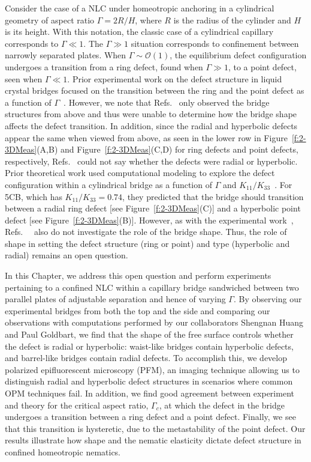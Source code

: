 Consider the case of a NLC under homeotropic anchoring in a cylindrical geometry of aspect ratio $\Gamma = 2 R/H$, where $R$ is the radius of the cylinder and $H$ is its height.
With this notation, the classic case of a cylindrical capillary corresponds to $\Gamma \ll 1$. The $\Gamma \gg 1$ situation corresponds to confinement between narrowly separated plates.
When $\Gamma \sim \mathcal{O}\left( 1 \right)$, the equilibrium defect configuration undergoes a transition from a ring defect, found when $\Gamma \gg 1$, to a point defect, seen when $\Gamma \ll 1$.
Prior experimental work on the defect structure in liquid crystal bridges focused on the transition between the ring and the point defect as a function of $\Gamma$~\cite{RN139,RN147}.
However, we note that Refs.~\cite{RN139,RN147} only observed the bridge structures from above and thus were unable to determine how the bridge shape affects the defect transition.
In addition, since the radial and hyperbolic defects appear the same when viewed from above, as seen in the lower row in Figure~\ref{f:2-3DMeas}(A,B) and Figure~\ref{f:2-3DMeas}(C,D) for ring defects and point defects, respectively, Refs.~\cite{RN139,RN147} could not say whether the defects were radial or hyperbolic.
Prior theoretical work used computational modeling to explore the defect configuration within a cylindrical bridge as a function of $\Gamma$ and $K_{11}/K_{33}$~\cite{RN138,RN144}.
For 5CB, which has $K_{11}/K_{33} = 0.74$, they predicted that the bridge should transition between a radial ring defect [see Figure~\ref{f:2-3DMeas}(C)] and a hyperbolic point defect [see Figure~\ref{f:2-3DMeas}(B)].
However, as with the experimental work~\cite{RN139,RN147}, Refs.~~\cite{RN138,RN144} also do not investigate the role of the bridge shape.
Thus, the role of shape in setting the defect structure (ring or point) and type (hyperbolic and radial) remains an open question.

In this Chapter, we address this open question and perform experiments pertaining to a confined NLC within a capillary bridge sandwiched between two parallel plates of adjustable separation and hence of varying $\Gamma$.
By observing our experimental bridges from both the top and the side and comparing our observations with computations performed by our collaborators Shengnan Huang and Paul Goldbart, we find that the shape of the free surface controls whether the defect is radial or hyperbolic: waist-like bridges contain hyperbolic defects, and barrel-like bridges contain radial defects.
To accomplish this, we develop polarized epifluorescent microscopy (PFM), an imaging technique allowing us to distinguish radial and hyperbolic defect structures in scenarios where common OPM techniques fail.
In addition, we find good agreement between experiment and theory for the critical aspect ratio, $\Gamma_c$, at which the defect in the bridge undergoes a transition between a ring defect and a point defect.
Finally, we see that this transition is hysteretic, due to the metastability of the point defect.
Our results illustrate how shape and the nematic elasticity dictate defect structure in confined homeotropic nematics.




